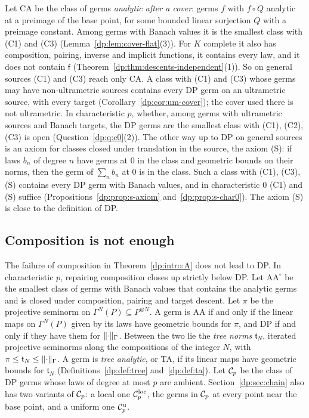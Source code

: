 Let CA be the class of germs \emph{analytic after a cover}: germs $f$ with $f\circ Q$ analytic at a preimage of the base point, for some bounded linear surjection $Q$ with a preimage constant. Among germs with Banach values it is the smallest class with (C1) and (C3) (Lemma~\ref{dp:lem:cover-flat}(3)). For $K$ complete it also has composition, pairing, inverse and implicit functions, it contains every law, and it does not contain $\mathsf f$ (Theorem~\ref{dp:thm:descents-independent}(1)). So on general sources (C1) and (C3) reach only CA. A class with (C1) and (C3) whose germs may have non-ultrametric sources contains every DP germ on an ultrametric source, with every target (Corollary~\ref{dp:cor:um-cover}); the cover used there is not ultrametric. In characteristic $p$, whether, among germs with ultrametric sources and Banach targets, the DP germs are the smallest class with (C1), (C2), (C3) is open (Question~\ref{dp:q:c0}(2)). The other way up to DP on general sources is an axiom for classes closed under translation in the source, the axiom (S): if laws $b_n$ of degree $n$ have germs at $0$ in the class and geometric bounds on their norms, then the germ of $\sum_nb_n$ at $0$ is in the class. Such a class with (C1), (C3), (S) contains every DP germ with Banach values, and in characteristic $0$ (C1) and (S) suffice (Propositions~\ref{dp:prop:s-axiom} and~\ref{dp:prop:s-char0}). The axiom (S) is close to the definition of DP.

\subsection*{Composition is not enough}

The failure of composition in Theorem~\ref{dp:intro:A} does not lead to DP. In characteristic $p$, repairing composition closes up strictly below DP. Let $\mathrm{AA}^\circ$ be the smallest class of germs with Banach values that contains the analytic germs and is closed under composition, pairing and target descent. Let $\pi$ be the projective seminorm on $\Gamma^N(P)\subseteq P^{\otimes N}$. A germ is AA if and only if the linear maps on $\Gamma^N(P)$ given by its laws have geometric bounds for $\pi$, and DP if and only if they have them for $\lVert \cdot\rVert_\Gamma$. Between the two lie the \emph{tree norms} $\mathfrak t_N$, iterated projective seminorms along the compositions of the integer $N$, with $\pi\le\mathfrak t_N\le\lVert \cdot\rVert_\Gamma$. A germ is \emph{tree analytic}, or TA, if its linear maps have geometric bounds for $\mathfrak t_N$ (Definitions~\ref{dp:def:tree} and~\ref{dp:def:ta}). Let $\mathcal{C}_p$ be the class of DP germs whose laws of degree at most $p$ are ambient. Section~\ref{dp:sec:chain} also has two variants of $\mathcal{C}_p$: a local one $\mathcal{C}_p^{\rm loc}$, the germs in $\mathcal{C}_p$ at every point near the base point, and a uniform one $\mathcal{C}_p^{\rm u}$.

